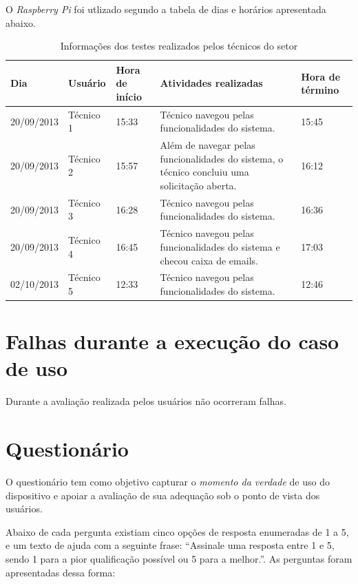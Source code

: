 O \textit{Raspberry Pi} foi utlizado segundo a tabela de dias e horários apresentada abaixo.

\begin{table}[!htpb]
 \centering
    \begin{tabular}{|p{2cm}|p{2cm}|p{2cm}|p{5cm}|p{2cm}|} 
    \hline
        \textbf{Dia} & \textbf{Usuário} & \textbf{Hora de início} & \textbf{Atividades realizadas} &  \textbf{Hora de término} \\
    \hline
         20/09/2013 & Técnico 1 & 15:33 & Técnico navegou pelas funcionalidades do sistema. & 15:45 \\
    \hline
        20/09/2013 & Técnico 2 & 15:57 & Além de navegar pelas funcionalidades do sistema, o técnico concluiu uma solicitação aberta. & 16:12 \\
    \hline
        20/09/2013 & Técnico 3 & 16:28 & Técnico navegou pelas funcionalidades do sistema. & 16:36 \\
    \hline
        20/09/2013 & Técnico 4 & 16:45 & Técnico navegou pelas funcionalidades do sistema e checou caixa de emails. & 17:03 \\
    \hline
        02/10/2013 & Técnico 5 & 12:33 & Técnico navegou pelas funcionalidades do sistema. & 12:46 \\
    \hline
    \end{tabular}
    \caption{Informações dos testes realizados pelos técnicos do setor}
    \label{t_fixa}
\end{table}

\section{Falhas durante a execução do caso de uso}

Durante a avaliação realizada pelos usuários não ocorreram falhas.

\section{Questionário}

O questionário tem como objetivo capturar o \textit{momento da verdade} de uso do dispositivo e apoiar a avaliação de sua adequação sob o ponto de vista dos usuários.

Abaixo de cada pergunta existiam cinco opções de resposta enumeradas de 1 a 5, e um texto de ajuda com a seguinte frase: “Assinale uma resposta entre 1 e 5, sendo 1 para a pior qualificação possível ou 5 para a melhor.”.
As perguntas foram apresentadas dessa forma:

